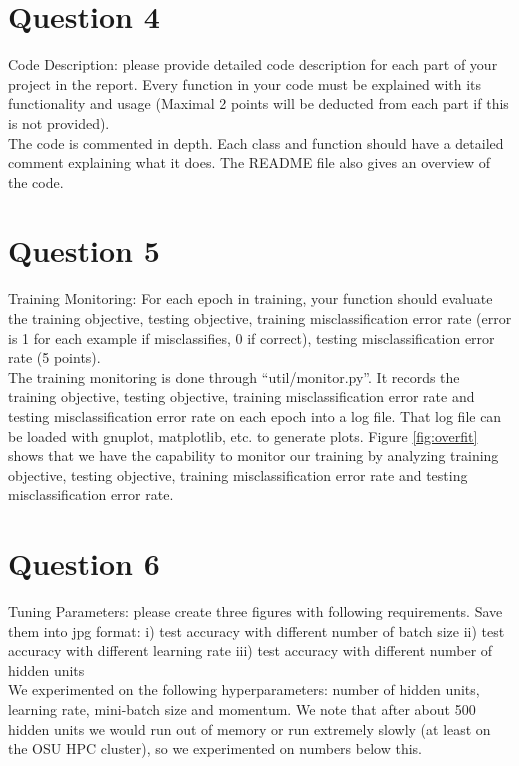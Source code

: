\documentclass[paper=a4, fontsize=11pt]{scrartcl}
\begin{document}
\section{Question 4}

{\small Code Description: please provide detailed code description for each part of your project in the report. Every function in your code must be explained with its functionality and usage (Maximal 2 points will be deducted from each part if this is not provided).}\\

The code is commented in depth.  Each class and function should have a detailed comment explaining what it does.  The README file also gives an overview of the code.

\section{Question 5}

{\small Training Monitoring: For each epoch in training, your function should evaluate the training objective, testing objective, training misclassification error rate (error is 1 for each example if misclassifies, 0 if correct), testing misclassification error rate (5 points).}\\

The training monitoring is done through ``util/monitor.py''.  It records the training objective, testing objective, training misclassification error rate and testing misclassification error rate on each epoch into a log file.  That log file can be loaded with gnuplot, matplotlib, etc. to generate plots.  Figure \ref{fig:overfit} shows that we have the capability to monitor our training by analyzing training objective, testing objective, training misclassification error rate and testing misclassification error rate.

\section{Question 6}

{\small Tuning Parameters: please create three figures with following requirements. Save them into jpg format:
i) test accuracy with different number of batch size
ii) test accuracy with different learning rate
iii) test accuracy with different number of hidden units}\\

We experimented on the following hyperparameters: number of hidden units, learning rate, mini-batch size and momentum.  We note that after about 500 hidden units we would run out of memory or run extremely slowly (at least on the OSU HPC cluster), so we experimented on numbers below this.
\end{document}
